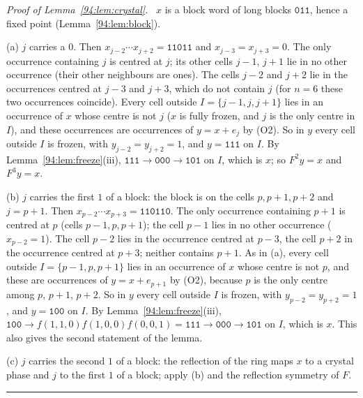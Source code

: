 \documentclass[10pt,a4paper]{article}
\newcommand{\qedmark}{\rule{1.1ex}{1.1ex}}
\newenvironment{proof}[1][Proof]{\par\smallskip\noindent\textit{#1.}\ }{\hfill\qedmark\par\smallskip}
\newcommand{\code}[1]{\mathtt{#1}}            %
\begin{document}
\begin{proof}[Proof of Lemma~\ref{94:lem:crystal}]
$x$ is a block word of long blocks $\code{011}$, hence a fixed point (Lemma~\ref{94:lem:block}).

(a) $j$ carries a $0$. Then $x_{j-2}\cdots x_{j+2}=\code{11011}$ and $x_{j-3}=x_{j+3}=0$. The only occurrence
containing $j$ is centred at $j$; its other cells $j-1$, $j+1$ lie in no other occurrence (their other neighbours
are ones). The cells $j-2$ and $j+2$ lie in the occurrences centred at $j-3$ and $j+3$, which do not contain $j$
(for $n=6$ these two occurrences coincide). Every cell outside $I=\{j-1,j,j+1\}$ lies in an occurrence of $x$ whose
centre is not $j$ ($x$ is fully frozen, and $j$ is the only centre in $I$), and these occurrences are occurrences of
$y=x+e_j$ by (O2). So in $y$ every cell outside $I$ is frozen, with
$y_{j-2}=y_{j+2}=1$, and $y=\code{111}$ on $I$. By Lemma~\ref{94:lem:freeze}(iii),
$\code{111}\to\code{000}\to\code{101}$ on $I$, which is $x$; so $F^2y=x$ and $F^3y=x$.

(b) $j$ carries the first $1$ of a block: the block is on the cells $p,p+1,p+2$ and $j=p+1$. Then
$x_{p-2}\cdots x_{p+3}=\code{110110}$. The only occurrence containing $p+1$ is centred at $p$ (cells $p-1,p,p+1$);
the cell $p-1$ lies in no other occurrence ($x_{p-2}=1$). The cell $p-2$ lies in the occurrence centred at $p-3$,
the cell $p+2$ in the occurrence centred at $p+3$; neither contains $p+1$. As in (a), every cell outside
$I=\{p-1,p,p+1\}$ lies in an occurrence of $x$ whose centre is not $p$, and these are occurrences of $y=x+e_{p+1}$
by (O2), because $p$ is the only centre among $p$, $p+1$, $p+2$. So in $y$ every cell outside
$I$ is frozen, with $y_{p-2}=y_{p+2}=1$, and $y=\code{100}$ on $I$. By
Lemma~\ref{94:lem:freeze}(iii),
$\code{100}\to f(1,1,0)f(1,0,0)f(0,0,1)=\code{111}\to\code{000}\to\code{101}$ on $I$, which is $x$. This also
gives the second statement of the lemma.

(c) $j$ carries the second $1$ of a block: the reflection of the ring maps $x$ to a crystal phase and $j$ to the
first $1$ of a block; apply (b) and the reflection symmetry of $F$.
\end{proof}
\end{document}
